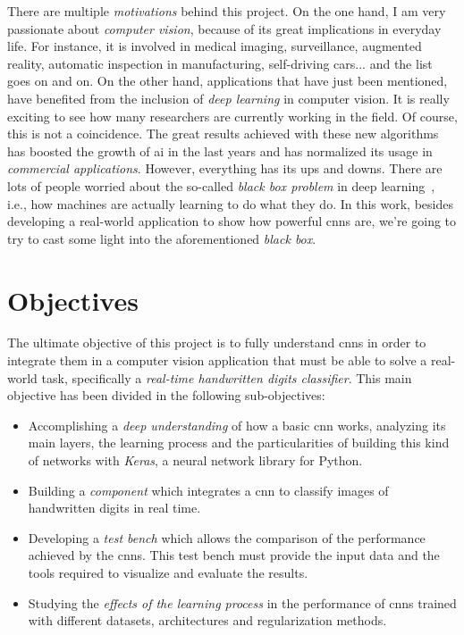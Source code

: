 There are multiple \emph{motivations} behind this project. On the one hand, I am very passionate about \emph{computer vision}, because of its great implications in everyday life. For instance, it is involved in medical imaging, surveillance, augmented reality, automatic inspection in manufacturing, self-driving cars... and the list goes on and on. On the other hand, applications that have just been mentioned, have benefited from the inclusion of \emph{deep learning} in computer vision. It is really exciting to see how many researchers are currently working in the field. Of course, this is not a coincidence. The great results achieved with these new algorithms has boosted the growth of \gls{ai} in the last years and has normalized its usage in \emph{commercial applications}. However, everything has its ups and downs. There are lots of people worried about the so-called \emph{\textit{black box} problem} in deep learning~\cite{black-box}, i.e., how machines are actually learning to do what they do. In this work, besides developing a real-world application to show how powerful \glspl{cnn} are, we're going to try to cast some light into the aforementioned \textit{black box}. 

\section{Objectives}\label{sec:objectives}
The ultimate objective of this project is to fully understand \glspl{cnn} in order to integrate them in a computer vision application that must be able to solve a real-world task, specifically a \emph{real-time handwritten digits classifier}. This main objective has been divided in the following sub-objectives: 
\begin{itemize}
	\item Accomplishing a \emph{deep understanding} of how a basic \gls{cnn} works, analyzing its main layers, the learning process and the particularities of building this kind of networks with \emph{Keras}, a neural network library for Python.
	\item Building a \emph{component} which integrates a \gls{cnn} to classify images of handwritten digits in real time.
	\item Developing a \emph{test bench} which allows the comparison of the performance achieved by the \glspl{cnn}. This test bench must provide the input data and the tools required to visualize and evaluate the results.
	\item Studying the \emph{effects of the learning process} in the performance of \glspl{cnn} trained with different datasets, architectures and regularization methods.
\end{itemize}


